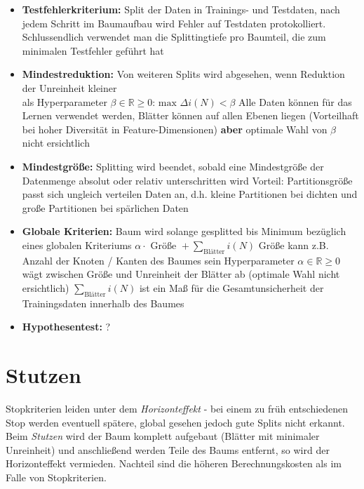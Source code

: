 \documentclass{report}
\begin{document}
\begin{itemize}
  \item \textbf{Testfehlerkriterium:} Split der Daten in Trainings- und Testdaten, nach jedem Schritt im Baumaufbau wird Fehler auf
  Testdaten protokolliert. Schlussendlich verwendet man die Splittingtiefe pro Baumteil, die zum minimalen Testfehler geführt hat
  \item \textbf{Mindestreduktion:} Von weiteren Splits wird abgesehen, wenn Reduktion der Unreinheit kleiner\\
  als Hyperparameter $\beta \in \mathbb{R} \geq 0$: $\text{max } \Delta i(N) < \beta$
  \subitem Alle Daten können für das Lernen verwendet werden, Blätter können
  \subitem auf allen Ebenen liegen (Vorteilhaft bei hoher Diversität
  \subitem in Feature-Dimensionen) \textbf{aber} optimale Wahl von $\beta$ nicht ersichtlich
  \item \textbf{Mindestgröße:} Splitting wird beendet, sobald eine Mindestgröße der Datenmenge absolut oder relativ unterschritten
  wird
  \subitem Vorteil: Partitionsgröße passt sich ungleich verteilen Daten an, d.h.
  \subitem kleine Partitionen bei dichten und
  \subitem große Partitionen bei spärlichen Daten
  \item \textbf{Globale Kriterien:} Baum wird solange gesplitted bis Minimum bezüglich eines globalen Kriteriums
  $\alpha \cdot \text{ Größe } + \sum_{\text{Blätter}}i(N)$
  \subitem Größe kann z.B. Anzahl der Knoten / Kanten des Baumes sein
  \subitem Hyperparameter $\alpha \in \mathbb{R} \geq 0$ wägt zwischen
  \subitem Größe und Unreinheit der Blätter ab (optimale Wahl nicht ersichtlich)
  \subitem $\sum_{\text{Blätter}}i(N)$ ist ein Maß für die Gesamtunsicherheit
  \subitem der Trainingsdaten innerhalb des Baumes
  \item \textbf{Hypothesentest:} ?
\end{itemize}

\section{Stutzen}

Stopkriterien leiden unter dem \textit{Horizonteffekt} - bei einem zu früh entschiedenen Stop werden eventuell spätere,
global gesehen jedoch gute Splits nicht erkannt. Beim \textit{Stutzen} wird der Baum komplett aufgebaut (Blätter mit minimaler
Unreinheit) und anschließend werden Teile des Baums entfernt, so wird der Horizonteffekt vermieden. Nachteil sind die höheren
Berechnungskosten als im Falle von Stopkriterien.
\end{document}
